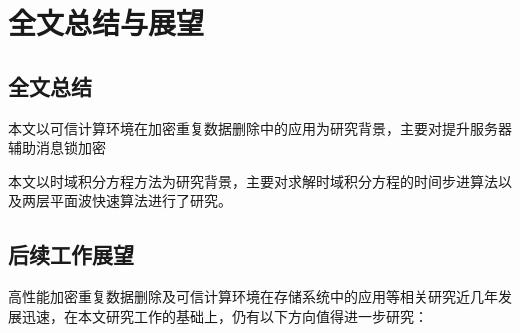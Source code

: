 \chapter{全文总结与展望}

\section{全文总结}

本文以可信计算环境在加密重复数据删除中的应用为研究背景，主要对提升服务器辅助消息锁加密

本文以时域积分方程方法为研究背景，主要对求解时域积分方程的时间步进算法以及两层平面波快速算法进行了研究。

\section{后续工作展望}

高性能加密重复数据删除及可信计算环境在存储系统中的应用等相关研究近几年发展迅速，在本文研究工作的基础上，仍有以下方向值得进一步研究：

